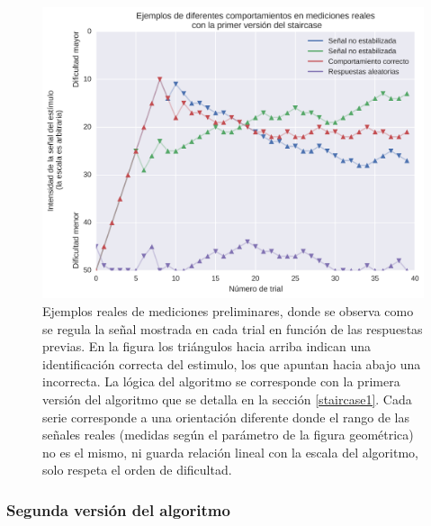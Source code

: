 \documentclass{article}
\begin{document}
    \begin{figure}
        \center
        \includegraphics[width=\textwidth]{Imagenes/StairCase1.png}
        \caption{Ejemplos reales de mediciones preliminares, donde se observa como se regula la señal mostrada en cada trial en función de las respuestas previas. En la figura los triángulos hacia arriba indican una identificación correcta del estimulo, los que apuntan hacia abajo una incorrecta. La lógica del algoritmo se corresponde con la primera versión del algoritmo que se detalla en la sección \ref{staircase1}. Cada serie corresponde a una orientación diferente donde el rango de las señales reales (medidas según el parámetro de la figura geométrica) no es el mismo, ni guarda relación lineal con la escala del algoritmo, solo respeta el orden de dificultad.}
        \label{fig:staircase1}
    \end{figure}    

    \subsubsection{Segunda versión del algoritmo} \label{staircase2}
    
\end{document}
